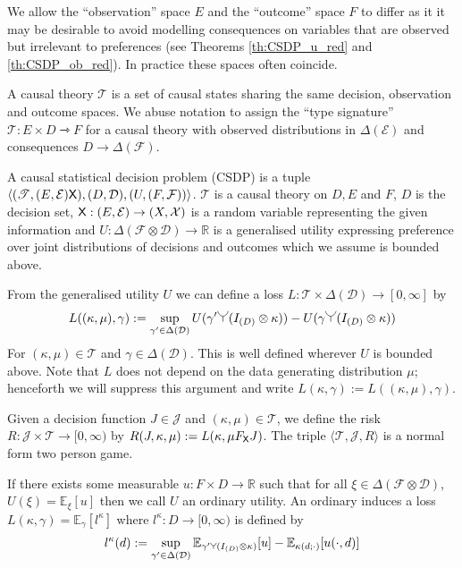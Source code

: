 We allow the ``observation'' space $E$ and the ``outcome'' space $F$ to differ as it it may be desirable to avoid modelling consequences on variables that are observed but irrelevant to preferences (see Theorems \ref{th:CSDP_u_red} and \ref{th:CSDP_ob_red}). In practice these spaces often coincide.

\begin{definition}\label{def:causal_theory}
A causal theory $\mathscr{T}$ is a set of causal states sharing the same decision, observation and outcome spaces. We abuse notation to assign the ``type signature'' $\mathscr{T}:E\times D\rightarrowtriangle F$ for a causal theory with observed distributions in $\Delta(\mathcal{E})$ and consequences $D\to \Delta(\mathcal{F})$.
\end{definition}

\begin{definition}\label{def:CSDP}
A causal statistical decision problem (CSDP) is a tuple $\langle (\mathscr{T}, (E,\mathcal{E}) \mathsf{X}), (D,\mathcal{D}), (U,(F,\mathcal{F})) \rangle$. $\mathscr{T}$ is a causal theory on $D, E$ and $F$, $D$ is the decision set, $\mathsf{X}:(E,\mathcal{E})\to (X,\mathcal{X})$ is a random variable representing the given information and $U:\Delta(\mathcal{F}\otimes \mathcal{D})\to \mathbb{R}$ is a generalised utility expressing preference over joint distributions of decisions and outcomes which we assume is bounded above.

From the generalised utility $U$ we can define a loss $L:\mathscr{T}\times\Delta(\mathcal{D})\to [0,\infty]$ by
\begin{align}
    L((\kappa,\mu),\gamma) := \sup_{\gamma'\in\Delta(\mathcal{D})} U(\gamma'\splitter{0.15}(I_{(D)}\otimes \kappa)) - U(\gamma\splitter{0.15}(I_{(D)}\otimes \kappa))\label{eq:canonical_loss}
\end{align}
For $(\kappa,\mu)\in \mathscr{T}$ and $\gamma\in \Delta(\mathcal{D})$. This is well defined wherever $U$ is bounded above. Note that $L$ does not depend on the data generating distribution $\mu$; henceforth we will suppress this argument and write $L(\kappa,\gamma):= L((\kappa,\mu),\gamma)$.

Given a decision function $J\in\mathscr{J}$ and $(\kappa,\mu)\in \mathscr{T}$, we define the risk $R:\mathscr{J}\times \mathscr{T}\to [0,\infty)$ by $R(J,\kappa,\mu) := L(\kappa,\mu F_{\mathsf{X}} J)$. The triple $\langle \mathscr{T}, \mathscr{J}, R\rangle$ is a normal form two person game.

If there exists some measurable $u:F\times D\to \mathbb{R}$ such that for all $\xi\in \Delta(\mathcal{F}\otimes\mathcal{D})$, $U(\xi)=\mathbb{E}_{\xi}[u]$ then we call $U$ an ordinary utility. An ordinary  induces a loss $L(\kappa,\gamma) = \mathbb{E}_{\gamma}[l^\kappa]$ where $l^\kappa:D\to [0,\infty)$ is defined by
\begin{align}
    l^\kappa(d) := \sup_{\gamma'\in \Delta(\mathcal{D})} \mathbb{E}_{\gamma'\splitter{0.08}(I_{(D)}\otimes \kappa)}[u] - \mathbb{E}_{\kappa(d;\cdot)}[u(\cdot,d)]\label{eq:induced_l}
\end{align}
\end{definition}

